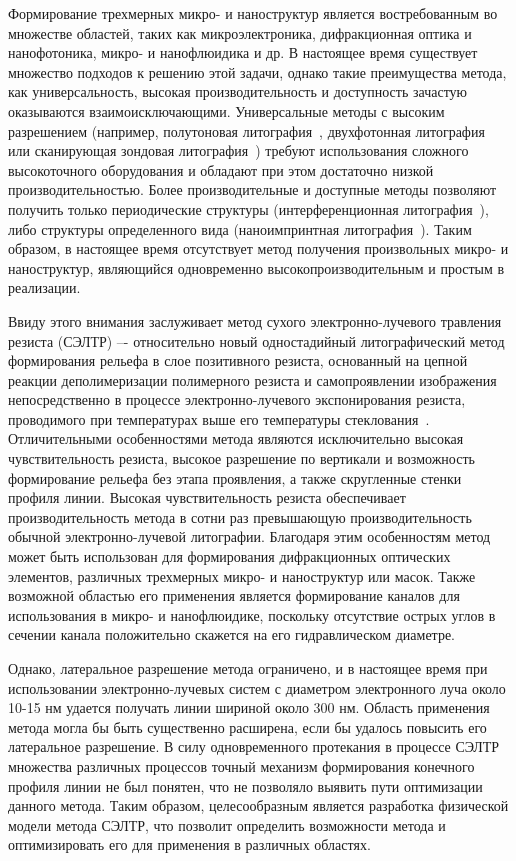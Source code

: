 \actuality

Формирование трехмерных микро- и наноструктур является востребованным во множестве областей, таких как микроэлектроника, дифракционная оптика и нанофотоника, микро- и нанофлюидика и др. В настоящее время существует множество подходов к решению этой задачи, однако такие преимущества метода, как универсальность, высокая производительность и доступность зачастую оказываются взаимоисключающими. Универсальные методы с высоким разрешением (например, полутоновая литография~\cite{GL_general}, двухфотонная литография~\cite{TPL_castle} или сканирующая зондовая литография~\cite{SPL_mechanical}) требуют использования сложного высокоточного оборудования и обладают при этом достаточно низкой производительностью. Более производительные и доступные методы позволяют получить только периодические структуры (интерференционная литография~\cite{IL_metamaterials}), либо структуры определенного вида (наноимпринтная литография~\cite{NIL_1}). Таким образом, в настоящее время отсутствует метод получения произвольных микро- и наноструктур, являющийся одновременно высокопроизводительным и простым в реализации.

Ввиду этого внимания заслуживает метод сухого электронно-лучевого травления резиста (СЭЛТР) –- относительно новый одностадийный литографический метод формирования рельефа в слое позитивного резиста, основанный на цепной реакции деполимеризации полимерного резиста и самопроявлении изображения непосредственно в процессе электронно-лучевого экспонирования резиста, проводимого при температурах выше его температуры стеклования~\cite{Bruk_2013, Bruk_2016_mee}. Отличительными особенностями метода являются исключительно высокая чувствительность резиста, высокое разрешение по вертикали и возможность формирование рельефа без этапа проявления, а также скругленные стенки профиля линии. Высокая чувствительность резиста обеспечивает производительность метода в сотни раз превышающую производительность обычной электронно-лучевой литографии. Благодаря этим особенностям метод может быть использован для формирования дифракционных оптических элементов, различных трехмерных микро- и наноструктур или масок. Также возможной областью его применения является формирование каналов для использования в микро- и нанофлюидике, поскольку отсутствие острых углов в сечении канала положительно скажется на его гидравлическом диаметре.

Однако, латеральное разрешение метода ограничено, и в настоящее время при использовании электронно-лучевых систем с диаметром электронного луча около 10-15 нм удается получать линии шириной около 300 нм. Область применения метода могла бы быть существенно расширена, если бы удалось повысить его латеральное разрешение. В силу одновременного протекания в процессе СЭЛТР множества различных процессов точный механизм формирования конечного профиля линии не был понятен, что не позволяло выявить пути оптимизации данного метода. Таким образом, целесообразным является разработка физической модели метода СЭЛТР, что позволит определить возможности метода и оптимизировать его для применения в различных областях.


